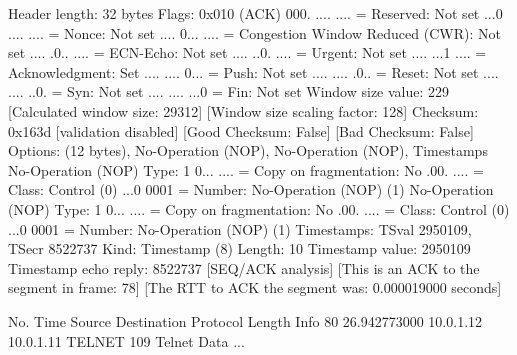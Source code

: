     Header length: 32 bytes
    Flags: 0x010 (ACK)
        000. .... .... = Reserved: Not set
        ...0 .... .... = Nonce: Not set
        .... 0... .... = Congestion Window Reduced (CWR): Not set
        .... .0.. .... = ECN-Echo: Not set
        .... ..0. .... = Urgent: Not set
        .... ...1 .... = Acknowledgment: Set
        .... .... 0... = Push: Not set
        .... .... .0.. = Reset: Not set
        .... .... ..0. = Syn: Not set
        .... .... ...0 = Fin: Not set
    Window size value: 229
    [Calculated window size: 29312]
    [Window size scaling factor: 128]
    Checksum: 0x163d [validation disabled]
        [Good Checksum: False]
        [Bad Checksum: False]
    Options: (12 bytes), No-Operation (NOP), No-Operation (NOP), Timestamps
        No-Operation (NOP)
            Type: 1
                0... .... = Copy on fragmentation: No
                .00. .... = Class: Control (0)
                ...0 0001 = Number: No-Operation (NOP) (1)
        No-Operation (NOP)
            Type: 1
                0... .... = Copy on fragmentation: No
                .00. .... = Class: Control (0)
                ...0 0001 = Number: No-Operation (NOP) (1)
        Timestamps: TSval 2950109, TSecr 8522737
            Kind: Timestamp (8)
            Length: 10
            Timestamp value: 2950109
            Timestamp echo reply: 8522737
    [SEQ/ACK analysis]
        [This is an ACK to the segment in frame: 78]
        [The RTT to ACK the segment was: 0.000019000 seconds]

No.     Time           Source                Destination           Protocol Length Info
     80 26.942773000   10.0.1.12             10.0.1.11             TELNET   109    Telnet Data ...

